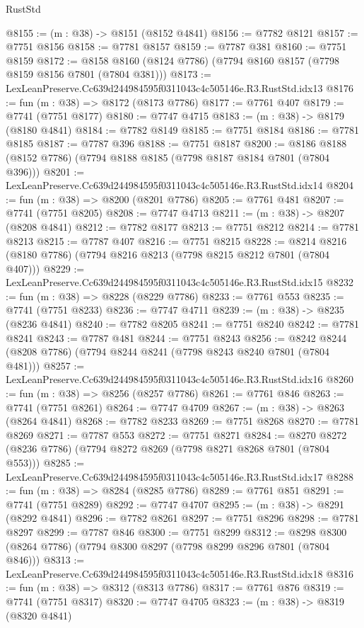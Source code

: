 \begin{lexlean}{RustStd}
\begin{coremodule}
@8155 := (m : @38) -> @8151 (@8152 @4841)
@8156 := @7782 @8121
@8157 := @7751 @8156
@8158 := @7781 @8157
@8159 := @7787 @381
@8160 := @7751 @8159
@8172 := @8158 @8160 (@8124 @7786) (@7794 @8160 @8157 (@7798 @8159 @8156 @7801 (@7804 @381)))
@8173 := LexLeanPreserve.Cc639d244984595f0311043c4c505146e.R3.RustStd.idx13
@8176 := fun (m : @38) => @8172 (@8173 @7786)
@8177 := @7761 @407
@8179 := @7741 (@7751 @8177)
@8180 := @7747 @4715
@8183 := (m : @38) -> @8179 (@8180 @4841)
@8184 := @7782 @8149
@8185 := @7751 @8184
@8186 := @7781 @8185
@8187 := @7787 @396
@8188 := @7751 @8187
@8200 := @8186 @8188 (@8152 @7786) (@7794 @8188 @8185 (@7798 @8187 @8184 @7801 (@7804 @396)))
@8201 := LexLeanPreserve.Cc639d244984595f0311043c4c505146e.R3.RustStd.idx14
@8204 := fun (m : @38) => @8200 (@8201 @7786)
@8205 := @7761 @481
@8207 := @7741 (@7751 @8205)
@8208 := @7747 @4713
@8211 := (m : @38) -> @8207 (@8208 @4841)
@8212 := @7782 @8177
@8213 := @7751 @8212
@8214 := @7781 @8213
@8215 := @7787 @407
@8216 := @7751 @8215
@8228 := @8214 @8216 (@8180 @7786) (@7794 @8216 @8213 (@7798 @8215 @8212 @7801 (@7804 @407)))
@8229 := LexLeanPreserve.Cc639d244984595f0311043c4c505146e.R3.RustStd.idx15
@8232 := fun (m : @38) => @8228 (@8229 @7786)
@8233 := @7761 @553
@8235 := @7741 (@7751 @8233)
@8236 := @7747 @4711
@8239 := (m : @38) -> @8235 (@8236 @4841)
@8240 := @7782 @8205
@8241 := @7751 @8240
@8242 := @7781 @8241
@8243 := @7787 @481
@8244 := @7751 @8243
@8256 := @8242 @8244 (@8208 @7786) (@7794 @8244 @8241 (@7798 @8243 @8240 @7801 (@7804 @481)))
@8257 := LexLeanPreserve.Cc639d244984595f0311043c4c505146e.R3.RustStd.idx16
@8260 := fun (m : @38) => @8256 (@8257 @7786)
@8261 := @7761 @846
@8263 := @7741 (@7751 @8261)
@8264 := @7747 @4709
@8267 := (m : @38) -> @8263 (@8264 @4841)
@8268 := @7782 @8233
@8269 := @7751 @8268
@8270 := @7781 @8269
@8271 := @7787 @553
@8272 := @7751 @8271
@8284 := @8270 @8272 (@8236 @7786) (@7794 @8272 @8269 (@7798 @8271 @8268 @7801 (@7804 @553)))
@8285 := LexLeanPreserve.Cc639d244984595f0311043c4c505146e.R3.RustStd.idx17
@8288 := fun (m : @38) => @8284 (@8285 @7786)
@8289 := @7761 @851
@8291 := @7741 (@7751 @8289)
@8292 := @7747 @4707
@8295 := (m : @38) -> @8291 (@8292 @4841)
@8296 := @7782 @8261
@8297 := @7751 @8296
@8298 := @7781 @8297
@8299 := @7787 @846
@8300 := @7751 @8299
@8312 := @8298 @8300 (@8264 @7786) (@7794 @8300 @8297 (@7798 @8299 @8296 @7801 (@7804 @846)))
@8313 := LexLeanPreserve.Cc639d244984595f0311043c4c505146e.R3.RustStd.idx18
@8316 := fun (m : @38) => @8312 (@8313 @7786)
@8317 := @7761 @876
@8319 := @7741 (@7751 @8317)
@8320 := @7747 @4705
@8323 := (m : @38) -> @8319 (@8320 @4841)

\end{coremodule}
\end{lexlean}
